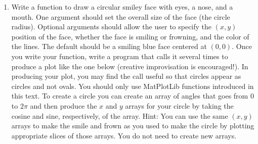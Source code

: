 \documentclass[letterpaper,10pt,english]{sphinxmanual}
\begin{document}
\begin{enumerate}
\item {} 
Write a function to draw a circular smiley face with eyes, a nose, and a mouth.  One argument should set the overall size of the face (the circle radius).  Optional arguments should allow the user to specify the $(x,y)$ position of the face, whether the face is smiling or frowning, and the color of the lines.  The default should be a smiling blue face centered at $(0,0)$.  Once you write your function, write a program that calls it several times to produce a plot like the one below (creative improvisation is encouraged!).  In producing your plot, you may find the call  useful so that circles appear as circles and not ovals.  You should only use MatPlotLib functions introduced in this text.  To create a circle you can create an array of angles that goes from 0 to $2\pi$ and then produce the $x$ and $y$ arrays for your circle by taking the cosine and sine, respectively, of the array.  Hint: You can use the same $(x,y)$ arrays to make the smile and frown as you used to make the circle by plotting appropriate slices of those arrays.  You do not need to create new arrays.
\begin{figure}[htbp]
\centering

\label{chap7/chap7_funcs:fig-faces}\end{figure}


\end{enumerate}
\end{document}
